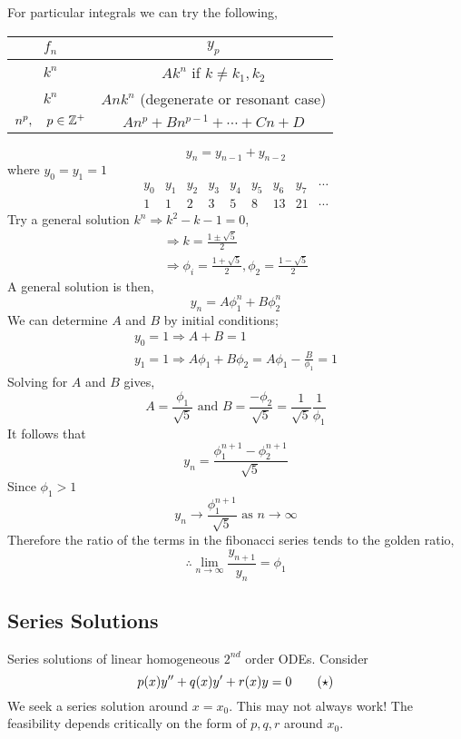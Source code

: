 \documentclass{article}
\begin{document}
For particular integrals we can try the following,
\begin{center}
    \begin{tabular}{c|c}
        $f_n$ & $y_p$ \\
        \hline
        $k^n$ & $Ak^n$ if $k \neq k_1, k_2$ \\
        $k^n$ & $Ank^n$ (degenerate or resonant case) \\
        $n^p, \quad p \in \mathbb{Z}^+$ & $An^p + Bn^{p-1} + \cdots + Cn + D$
    \end{tabular}
\end{center}

\begin{eg}
    \[
        y_n = y_{n-1} + y_{n-2}  
    \]
    where $y_0 = y_1 = 1$
    \[
        \begin{array}{ccccccccc}
            y_0 & y_1 & y_2 & y_3 & y_4 & y_5 & y_6 & y_7 & \cdots \\
            \hline
            1   & 1   & 2   & 3   & 5   & 8   & 13  & 21 & \cdots
        \end{array}  
    \]
    Try a general solution $k^n \Rightarrow k^2 - k - 1 = 0$,
    \begin{align*}
        \Rightarrow k = \frac{1 \pm \sqrt{5}}{2} \\
        \Rightarrow \phi_i = \frac{1 + \sqrt{5}}{2}, \phi_2 = \frac{1 - \sqrt{5}}{2}
    \end{align*}
    A general solution is then,
    \[
        y_n = A \phi_1^n + B \phi_2^n  
    \]
    We can determine $A$ and $B$ by initial conditions;
    \begin{align*}
        y_0 = 1 \Rightarrow A + B = 1 \\
        y_1 = 1 \Rightarrow A \phi_1 + B \phi_2 = A \phi_1 - \frac{B}{\phi_1} = 1
    \end{align*}
    Solving for $A$ and $B$ gives,
    \[
        A = \frac{\phi_1}{\sqrt{5}} \text{ and } B = \frac{-\phi_2}{\sqrt{5}} = \frac{1}{\sqrt{5}} \frac{1}{\phi_1}
    \]
    It follows that
    \[
        y_n = \frac{\phi_1^{n+1} - \phi_2^{n+1}}{\sqrt{5}}  
    \]
    Since $\phi_1 > 1$
    \[
        y_n \rightarrow \frac{\phi_1^{n+1}}{\sqrt{5}} \text{ as } n \rightarrow \infty
    \]
    Therefore the ratio of the terms in the fibonacci series tends to the golden ratio,
    \[
        \therefore \lim_{n \rightarrow \infty} \frac{y_{n+1}}{y_n} = \phi_1  
    \]
\end{eg}

\subsection{Series Solutions}
Series solutions of linear homogeneous $2^{nd}$ order ODEs. Consider
\[
    p(x) y'' + q(x) y' + r(x) y = 0 \tagstar
\]
We seek a series solution around $x = x_0$. This may not always work!
The feasibility depends critically on the form of $p, q, r$ around $x_0$.
\end{document}
